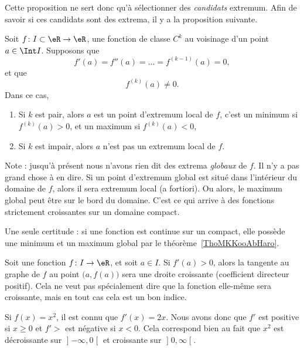 Cette proposition ne sert donc qu'à sélectionner des \emph{candidats} extremum. Afin de savoir si ces candidats sont des extrema, il y a la proposition suivante.
\begin{proposition}
Soit $f\colon I\subset \eR\to \eR$, une fonction de classe $C^k$ au voisinage d'un point $a\in\Int I$. Supposons que
\begin{equation}
    f'(a)=f''(a)=\ldots=f^{(k-1)}(a)=0,
\end{equation}
et que
\begin{equation}
    f^{(k)}(a)\neq 0.
\end{equation}
Dans ce cas,
\begin{enumerate}

\item
Si $k$ est pair, alors $a$ est un point d'extremum local de $f$, c'est un minimum si $f^{(k)}(a)>0$, et un maximum si $f^{(k)}(a)<0$,
\item
Si $k$ est impair, alors $a$ n'est pas un extremum local de $f$.

\end{enumerate}
\end{proposition}

Note : jusqu'à présent nous n'avons rien dit des extrema \emph{globaux} de $f$. Il n'y a pas grand chose à en dire. Si un point d'extremum global est situé dans l'intérieur du domaine de $f$, alors il sera extremum local (a fortiori). Ou alors, le maximum global peut être sur le bord du domaine. C'est ce qui arrive à des fonctions strictement croissantes sur un domaine compact.

Une seule certitude : si une fonction est continue sur un compact, elle possède une minimum et un maximum global par le théorème~\ref{ThoMKKooAbHaro}.

Soit une fonction $f\colon I\to \eR$, et soit $a\in I$. Si $f'(a)>0$, alors la tangente au graphe de $f$ au point $\big( a,f(a) \big)$ sera une droite croissante (coefficient directeur positif). Cela ne veut pas spécialement dire que la fonction elle-même sera croissante, mais en tout cas cela est un bon indice.

\begin{example}
	Si $f(x)=x^2$, il est connu que $f'(x)=2x$. Nous avons donc que $f'$ est positive si $x\geq 0$ et $f'>$ est négative si $x<0$. Cela correspond bien au fait que $x^2$ est décroissante sur $\mathopen] -\infty , 0 \mathclose[$ et croissante sur $\mathopen] 0 , \infty \mathclose[$.
\end{example}

